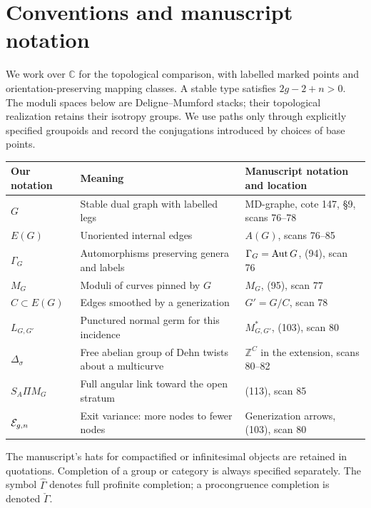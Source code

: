 \section*{Conventions and manuscript notation}
We work over $\mathbb C$ for the topological comparison, with labelled marked points and orientation-preserving mapping classes. A stable type satisfies $2g-2+n>0$. The moduli spaces below are Deligne--Mumford stacks; their topological realization retains their isotropy groups. We use paths only through explicitly specified groupoids and record the conjugations introduced by choices of base points.

\begin{longtable}{p{}p{}p{}}
\toprule
Our notation & Meaning & Manuscript notation and location\\
\midrule
$G$ & Stable dual graph with labelled legs & MD-graphe, cote 147, \S9, scans 76--78\\
$E(G)$ & Unoriented internal edges & $A(G)$, scans 76--85\\
$\Gamma_G$ & Automorphisms preserving genera and labels & $\Gamma_G=\operatorname{Aut} G$, (94), scan 76\\
$M_G$ & Moduli of curves pinned by $G$ & $M_G$, (95), scan 77\\
$C\subset E(G)$ & Edges smoothed by a generization & $G'=G/C$, scan 78\\
$L_{G,G'}$ & Punctured normal germ for this incidence & $M^*_{G,G'}$, (103), scan 80\\
$\Delta_\sigma$ & Free abelian group of Dehn twists about a multicurve & $\mathbb Z^C$ in the extension, scans 80--82\\
$S_A\Pi M_G$ & Full angular link toward the open stratum & (113), scan 85\\
$\mathcal E_{g,n}$ & Exit variance: more nodes to fewer nodes & Generization arrows, (103), scan 80\\
\bottomrule
\end{longtable}

The manuscript's hats for compactified or infinitesimal objects are retained in quotations. Completion of a group or category is always specified separately. The symbol $\widehat\Gamma$ denotes full profinite completion; a procongruence completion is denoted $\check\Gamma$.
